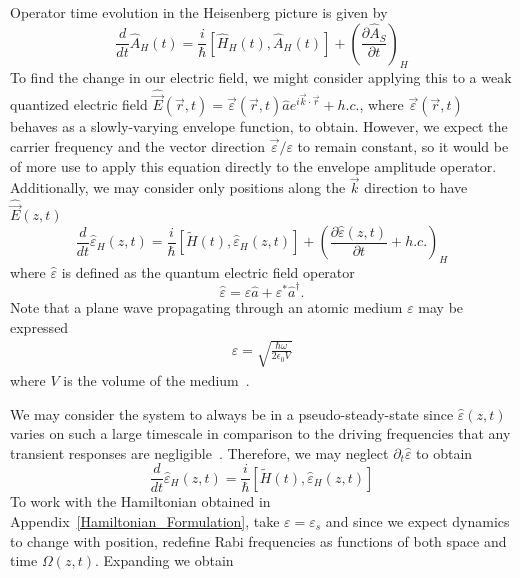\documentclass[aps,pra,showpacs,amsmath,amssymb,nofootinbib,longbibliography,superscriptaddress
]{revtex4-1}
\theoremstyle{definition}
\theoremstyle{remark}
\newcommand{\0}{\hat{0}}
\begin{document}
Operator time evolution in the Heisenberg picture is given by
\begin{equation}
    \frac{d}{dt}\hat{A}_{H}(t) = \frac{i}{\hbar} \left[ \hat{H}_H(t), \hat{A}_H(t) \right] + {\left( \frac{\partial \hat{A}_S}{\partial t} \right)}_H
\end{equation}
To find the change in our electric field, we might consider applying this to a weak quantized electric field $\hat{\vec{E}}(\vec{r}, t) = \vec{\varepsilon}(\vec{r}, t) \hat{a} e^{i \vec{k} \cdot \vec{r}} + h.c.$, where $\vec{\varepsilon}(\vec{r}, t)$ behaves as a slowly-varying envelope function, to obtain. However, we expect the carrier frequency and the vector direction $\vec{\varepsilon} / \varepsilon$ to remain constant, so it would be of more use to apply this equation directly to the envelope amplitude operator. Additionally, we may consider only positions along the $\vec{k}$ direction to have $\hat{\vec{E}}(z, t)$
\begin{equation}
    \frac{d}{dt}\hat{\varepsilon}_H(z, t) = \frac{i}{\hbar} \left[ \tilde{H}(t), \hat{\varepsilon}_H(z, t) \right] + {\left(\frac{\partial \hat{\varepsilon}(z, t)}{\partial t}  + h.c.\right)}_H
\end{equation}
where $\hat{\varepsilon}$ is defined as the quantum electric field operator
\begin{equation}
    \hat{\varepsilon} = \varepsilon \hat{a} + \varepsilon^* \hat{a}^{\dagger}.
\end{equation}
Note that a plane wave propagating through an atomic medium $\varepsilon$ may be expressed
\begin{align}\label{varepsilonIdentity}
    \varepsilon = \sqrt{\frac{\hbar \omega}{2 \epsilon_0 V}}
\end{align}
where $V$ is the volume of the medium~\cite{QuantumOptics}.

We may consider the system to always be in a pseudo-steady-state since $\hat{\varepsilon}(z, t)$ varies on such a large timescale in comparison to the driving frequencies that any transient responses are negligible~\cite{MacRae}. Therefore, we may neglect $\partial_t \hat{\varepsilon}$ to obtain
\begin{equation}
    \frac{d}{dt}\hat{\varepsilon}_H(z, t) = \frac{i}{\hbar} \left[ \tilde{H}(t), \hat{\varepsilon}_H(z, t) \right]
\end{equation}
To work with the Hamiltonian obtained in Appendix~\ref{Hamiltonian_Formulation}, take $\varepsilon = \varepsilon_s$ and since we expect dynamics to change with position, redefine Rabi frequencies as functions of both space and time $\Omega(z, t)$. Expanding we obtain
\end{document}
